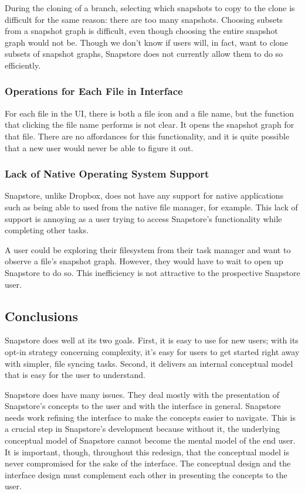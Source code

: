 During the cloning of a branch, selecting which snapshots to copy to the clone is difficult for the same reason: there are too many snapshots. Choosing subsets from a snapshot graph is difficult, even though choosing the entire snapshot graph would not be. Though we don't know if users will, in fact, want to clone subsets of snapshot graphs, Snapstore does not currently allow them to do so efficiently.

\subsubsection{Operations for Each File in Interface}

For each file in the UI, there is both a file icon and a file name, but the function that clicking the file name performs is not clear. It opens the snapshot graph for that file. There are no affordances for this functionality, and it is quite possible that a new user would never be able to figure it out.

\subsubsection{Lack of Native Operating System Support}

Snapstore, unlike Dropbox, does not have any support for native applications such as being able to used from the native file manager, for example. This lack of support is annoying as a user trying to access Snapstore's functionality while completing other tasks. 

A user could be exploring their filesystem from their task manager and want to observe a file's snapshot graph. However, they would have to wait to open up Snapstore to do so. This inefficiency is not attractive to the prospective Snapstore user.

\subsection{Conclusions}

Snapstore does well at its two goals. First, it is easy to use for new users; with its opt-in strategy concerning complexity, it's easy for users to get started right away with simpler, file syncing tasks. Second, it delivers an internal conceptual model that is easy for the user to understand.

Snapstore does have many issues. They deal mostly with the presentation of Snapstore's concepts to the user and with the interface in general. Snapstore needs work refining the interface to make the concepts easier to navigate. This is a crucial step in Snapstore's development because without it, the underlying conceptual model of Snapstore cannot become the mental model of the end user. It is important, though, throughout this redesign, that the conceptual model is never compromised for the sake of the interface. The conceptual design and the interface design must complement each other in presenting the concepts to the user.



